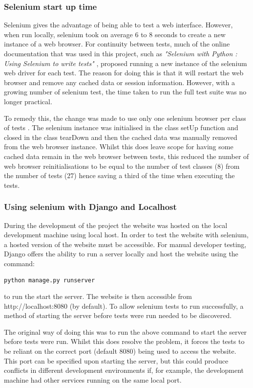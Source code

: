 \subsubsection{Selenium start up time}
Selenium gives the advantage of being able to test a web interface. However, when run locally, selenium took on average 6 to 8 seconds to create a new instance of a web browser. For continuity between tests,  much of the online documentation that was used in this project, such as \textit{"Selenium with Python : Using Selenium to write tests"} \cite{selenium_guide}, proposed running a new instance of the selenium web driver for each test. The reason for doing this is that it will restart the web browser and remove any cached data or session information. However, with a growing number of selenium test, the time taken to run the full test suite was no longer practical.

To remedy this, the change was made to use only one selenium browser per class of tests \cite{django_live_server_test}. The selenium instance was initialised in the class setUp function and closed in the class tearDown and then the cached data was manually removed from the web browser instance. Whilst this does leave scope for having some cached data remain in the web browser between tests, this reduced the number of web browser reinitialisations to be equal to the number of test classes (8) from the number of tests (27) hence saving a third of the time when executing the tests.

\subsubsection{Using selenium with Django and Localhost}
During the development of the project the website was hosted on the local development machine using local host. In order to test the website with selenium, a hosted version of the website must be accessible. For manual developer testing, Django offers the ability to run a server locally and host the website using the command: \begin{verbatim}
python manage.py runserver 
\end{verbatim}
to run the start the server. The website is then accessible from http://localhost:8080 (by default). To allow selenium tests to run successfully, a method of starting the server before tests were run needed to be discovered.

The original way of doing this was to run the above command to start the server before tests were run. Whilst this does resolve the problem, it forces the tests to be reliant on the correct port (default 8080) being used to access the website. This port can be specified upon starting the server, but this could produce conflicts in different development environments if, for example, the development machine had other services running on the same local port.

